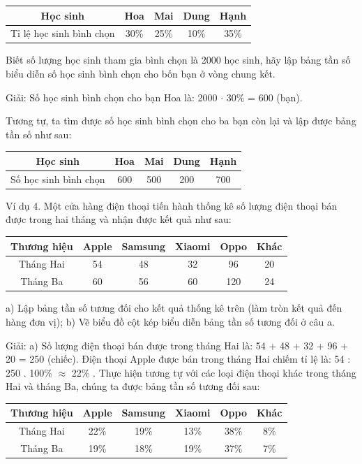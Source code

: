 \documentclass[%
    fontsize=12pt,%
    chapterprefix=false,%
    open=right,%
    twoside=false,%
    numbers=noenddot,%
    headings=optiontohead,%
    final,%
    DIV=15,%
    parskip=half %
]{scrbook}
\begin{document}
\begin{tabular}{|c|c|c|c|c|} \hline Học sinh & Hoa & Mai & Dung & Hạnh \\ \hline Tỉ lệ học sinh bình chọn & 30\% & 25\% & 10\% & 35\% \\ \hline \end{tabular}

Biết số lượng học sinh tham gia bình chọn là 2000 học sinh, hãy lập bảng tần số biểu diễn số học sinh bình chọn cho bốn bạn ở vòng chung kết.

Giải: Số học sinh bình chọn cho bạn Hoa là: 2000 $\cdot$ 30\% = 600 (bạn).

Tương tự, ta tìm được số học sinh bình chọn cho ba bạn còn lại và lập được bảng tần số như sau:

\begin{tabular}{|c|c|c|c|c|} \hline Học sinh & Hoa & Mai & Dung & Hạnh \\ \hline Số học sinh bình chọn & 600 & 500 & 200 & 700 \\ \hline \end{tabular}

Ví dụ 4. Một cửa hàng điện thoại tiến hành thống kê số lượng điện thoại bán được trong hai tháng và nhận được kết quả như sau:

\begin{tabular}{|c|c|c|c|c|c|} \hline Thương hiệu & Apple & Samsung & Xiaomi & Oppo & Khác \\ \hline Tháng Hai & 54 & 48 & 32 & 96 & 20 \\ \hline Tháng Ba & 60 & 56 & 60 & 120 & 24 \\ \hline \end{tabular}

a) Lập bảng tần số tương đối cho kết quả thống kê trên (làm tròn kết quả đến hàng đơn vị); b) Vẽ biểu đồ cột kép biểu diễn bảng tần số tương đối ở câu a.

Giải: a) Số lượng điện thoại bán được trong tháng Hai là: 54 + 48 + 32 + 96 + 20 = 250 (chiếc). Điện thoại Apple được bán trong tháng Hai chiếm tỉ lệ là: 54 : 250 . 100\% $\approx$ 22\% . Thực hiện tương tự với các loại điện thoại khác trong tháng Hai và tháng Ba, chúng ta được bảng tần số tương đối sau:

\begin{tabular}{|c|c|c|c|c|c|} \hline Thương hiệu & Apple & Samsung & Xiaomi & Oppo & Khác \\ \hline Tháng Hai & 22\% & 19\% & 13\% & 38\% & 8\% \\ \hline Tháng Ba & 19\% & 18\% & 19\% & 37\% & 7\% \\ \hline \end{tabular}
\end{document}
